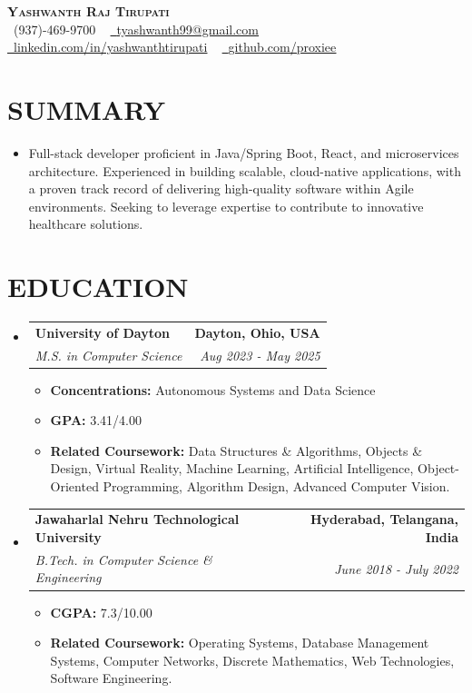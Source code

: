 \documentclass[letterpaper,11pt]{article}
\makeatletter
\newcommand{\resumeItem}[1]{\item\small{{#1 \vspace{-3pt}}}}
\newcommand{\resumeSubheading}[4]{\vspace{-2pt}\item\begin{tabular*}{0.97\textwidth}[t]{l@{\extracolsep{\fill}}r}\textbf{#1} & #2 \\\textit{\small#3} & \textit{\small #4} \\\end{tabular*}\vspace{-7pt}}
\newcommand{\resumeSubHeadingListStart}{\begin{itemize}[leftmargin=0.15in, label={}]}
\newcommand{\resumeSubHeadingListEnd}{\end{itemize}}
\newcommand{\resumeItemListStart}{\begin{itemize}}
\newcommand{\resumeItemListEnd}{\end{itemize}\vspace{-5pt}}
\makeatother
\begin{document}
\begin{center}
    \textbf{\Huge \scshape {\fontsize{15pt}{20pt}\selectfont Yashwanth Raj Tirupati}} \\ \vspace{1pt}
    \small \raisebox{-0.1\height}\faPhone\ (937)-469-9700 ~ \href{mailto:tyashwanth99@gmail.com}{\raisebox{-0.2\height}\faEnvelope\  \underline{tyashwanth99@gmail.com}} ~ 
    \href{https://linkedin.com/in/yashwanthtirupati}{\raisebox{-0.2\height}\faLinkedin\ \underline{linkedin.com/in/yashwanthtirupati}} ~ 
    \href{https://github.com/proxiee}{\raisebox{-0.2\height}\faGithub\ \underline{github.com/proxiee}}
    \vspace{-8pt}
\end{center}


\section{{\fontsize{9pt}{20pt}\selectfont \textbf{SUMMARY}}}
\resumeSubHeadingListStart

\resumeItem{Full-stack developer proficient in Java/Spring Boot, React, and microservices architecture.  Experienced in building scalable, cloud-native applications,  with a proven track record of delivering high-quality software within Agile environments.  Seeking to leverage expertise to contribute to innovative healthcare solutions.}
\resumeSubHeadingListEnd
\vspace{-18pt}

\section{{\fontsize{9pt}{20pt}\selectfont \textbf{EDUCATION}}}
\resumeSubHeadingListStart
\resumeSubheading{University of Dayton}{\textbf{Dayton, Ohio, USA}}{M.S. in Computer Science}{Aug 2023 - May 2025}
\resumeItemListStart
\resumeItem{\textbf{Concentrations:} Autonomous Systems and Data Science}
\resumeItem{\textbf{GPA:} 3.41/4.00}
\resumeItem{\textbf{Related Coursework:} Data Structures \& Algorithms, Objects \& Design, Virtual Reality, Machine Learning, Artificial Intelligence, Object-Oriented Programming, Algorithm Design, Advanced Computer Vision.}
\resumeItemListEnd
\resumeSubheading{Jawaharlal Nehru Technological University}{\textbf{Hyderabad, Telangana, India}}{B.Tech. in Computer Science \& Engineering}{June 2018 - July 2022}
\resumeItemListStart
\resumeItem{\textbf{CGPA:} 7.3/10.00}
\resumeItem{\textbf{Related Coursework:} Operating Systems, Database Management Systems, Computer Networks, Discrete Mathematics, Web Technologies, Software Engineering.}
\resumeItemListEnd
\resumeSubHeadingListEnd
\vspace{-18pt}
\end{document}
